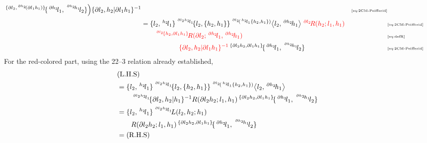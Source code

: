 \documentclass[11pt, reqno]{amsart} %
\newcommand{\act}[1]{\,\sp{#1}\!}
\newcommand{\red}[1]{\textcolor{red}{#1}}
\theoremstyle{definition}
\theoremstyle{remark}
\numberwithin{equation}{section}
\begin{document}
\begin{align*}
  \act{\{\partial l_2,\act{\partial h_2}(\partial l_1h_1)\}}\{\act{\partial h_2}l_1,\act{\act{\partial h_2}h_1}l_2\}
  \Bigr)\{\partial l_2,h_2|\partial l_1h_1\}^{-1} & &\text{\tiny \eqref{eq:2CM-Peifferid}} \\
  &= \{l_2,\act{h_2}l_1\}\act{\act{\partial l_2h_2}l_1}\{l_2,\{h_2,h_1\}\}\act{\act{\partial l_2}(\act{h_2}l_1\{h_2,h_1\})}\left<l_2,\act{\partial h_2}h_1\right>\red{\act{\partial l_2}R(h_2;l_1,h_1)} & &\text{\tiny \eqref{eq:2CM-Peifferid}} \\
  &\qquad \red{\act{\act{\partial l_2}\{h_2,\partial l_1h_1\}}R(\partial l_2;\act{\partial h_2}l_1,\act{\partial h_2}h_1)} & &\text{\tiny \eqref{eq:defR}} \\
  &\hspace{2cm} 
  \red{\{\partial l_2,h_2|\partial l_1h_1\}^{-1}}\act{\{\partial l_2h_2,\partial l_1h_1\}}\{\act{\partial h_2}l_1,\act{\act{\partial h_2}h_1}l_2\} & &\text{\tiny \eqref{eq:2CM-Peifferid}}
\end{align*}
For the red-colored part, using the 22--3 relation already established,
\begin{align*}
  &(\text{L.H.S}) \\
  &= \{l_2,\act{h_2}l_1\}\act{\act{\partial l_2h_2}l_1}\{l_2,\{h_2,h_1\}\}\act{\act{\partial l_2}(\act{h_2}l_1\{h_2,h_1\})}\left<l_2,\act{\partial h_2}h_1\right> \\
  &\qquad \act{\act{\partial l_2h_2}l_1}\{\partial l_2,h_2|h_1\}^{-1}R(\partial l_2h_2;l_1,h_1)\act{\{\partial l_2h_2,\partial l_1h_1\}}\{\act{\partial h_2}l_1,\act{\act{\partial h_2}h_1}l_2\} \\
  &= \{l_2,\act{h_2}l_1\}\act{\act{\partial l_2h_2}l_1}L(l_2,h_2;h_1)\\
  &\qquad R(\partial l_2h_2;l_1,h_1)\act{\{\partial l_2h_2,\partial l_1h_1\}}\{\act{\partial h_2}l_1,\act{\act{\partial h_2}h_1}l_2\} \\
  &= (\text{R.H.S})
\end{align*}
\end{document}
